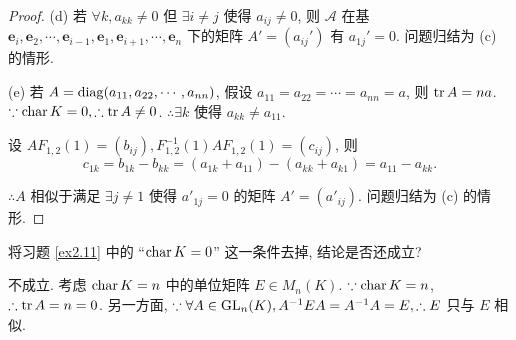 \documentclass[color=black,device=normal,lang=cn,mode=geye]{elegantnote}
\begin{document}
\begin{proof}
    (d) 若 $\forall k,a_{kk}\neq0$ 但 $\exists i\neq j$ 使得 $a_{ij}\neq0$, 则 $\mathcal{A}$ 在基 $\boldsymbol{e}_i,\boldsymbol{e}_2,\cdots,\boldsymbol{e}_{i-1},\boldsymbol{e}_1,\boldsymbol{e}_{i+1},\cdots,\boldsymbol{e}_n$ 下的矩阵 $A'=(a_{ij}')$ 有 $a_{1j}'=0$. 问题归结为 (c) 的情形.

    (e) 若 $A=\operatorname{diag} (a_{11},a_{22},\cdots,a_{nn})$, 假设 $a_{11}=a_{22}=\cdots=a_{nn}=a$, 则 $\operatorname{tr} A=na$. $\because\operatorname{char} K=0,\therefore\operatorname{tr} A\neq0$. $\therefore\exists k$ 使得 $a_{kk}\neq a_{11}$.

    设 $AF_{1,2}(1)=(b_{ij}),F^{-1}_{1,2}(1)AF_{1,2}(1)=(c_{ij})$, 则
    \[c_{1k}=b_{1k}-b_{kk}=(a_{1k}+a_{11})-(a_{kk}+a_{k1})=a_{11}-a_{kk}.\]
    
    $\therefore A$ 相似于满足 $\exists j\neq 1$ 使得 $a'_{1j}=0$ 的矩阵 $A'=(a'_{ij})$. 问题归结为 (c) 的情形.
\end{proof}
\begin{exercise}%
    将习题 \ref{ex2.11} 中的 ``$\operatorname{char} K=0$'' 这一条件去掉, 结论是否还成立?
\end{exercise}
\begin{solution}
    不成立. 考虑 $\operatorname{char} K=n$ 中的单位矩阵 $E\in M_n(K)$. $\because\operatorname{char} K=n$, $\therefore\operatorname{tr} A=n=0$. 另一方面, $\because\forall A\in\operatorname{GL} _n(K),A^{-1}EA=A^{-1}A=E,\therefore E$ 只与 $E$ 相似.
\end{solution}
\end{document}
